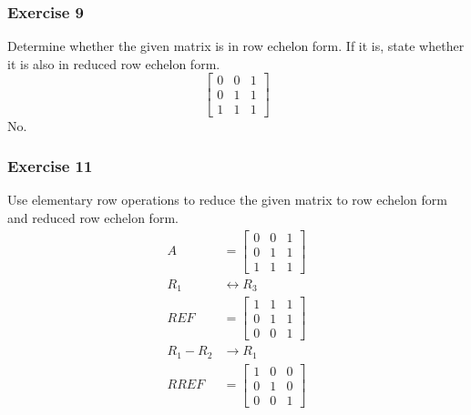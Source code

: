 \documentclass[letterpaper, 12pt]{math}
\begin{document}
\subsubsection*{Exercise 9}
Determine whether the given matrix is in row echelon form. If it is, state
whether it is also in reduced row echelon form.
\[ \begin{bmatrix}
  0 & 0 & 1 \\
  0 & 1 & 1 \\
  1 & 1 & 1
\end{bmatrix} \]
No.

\subsubsection*{Exercise 11}
Use elementary row operations to reduce the given matrix to row echelon form
and reduced row echelon form.
\begin{align*}
  A &= \begin{bmatrix}
    0 & 0 & 1 \\
    0 & 1 & 1 \\
    1 & 1 & 1
  \end{bmatrix} \\
  R_1 &\leftrightarrow R_3 \\
  REF &= \begin{bmatrix}
    1 & 1 & 1 \\
    0 & 1 & 1 \\
    0 & 0 & 1
  \end{bmatrix} \\
  R_1-R_2 &\to R_1 \\
  RREF &= \begin{bmatrix}
    1 & 0 & 0 \\
    0 & 1 & 0 \\
    0 & 0 & 1
  \end{bmatrix}
\end{align*}
\end{document}
